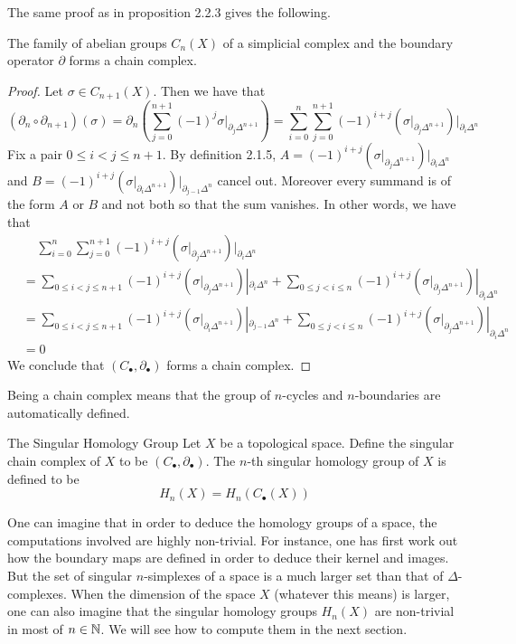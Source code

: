\documentclass[a4paper]{article}
\begin{document}
The same proof as in proposition 2.2.3 gives the following. 

\begin{prp}{}{} The family of abelian groups $C_n(X)$ of a simplicial complex and the boundary operator $\partial$ forms a chain complex. \tcbline
\begin{proof}
Let $\sigma\in C_{n+1}(X)$. Then we have that $$(\partial_n\circ\partial_{n+1})(\sigma)=\partial_n\left(\sum_{j=0}^{n+1}(-1)^j\sigma|_{\partial_j\Delta^{n+1}}\right)=\sum_{i=0}^n\sum_{j=0}^{n+1}(-1)^{i+j}\left(\sigma|_{\partial_j\Delta^{n+1}}\right)|_{\partial_i\Delta^n}$$ Fix a pair $0\leq i<j\leq n+1$. By definition 2.1.5, $A=(-1)^{i+j}\left(\sigma|_{\partial_j\Delta^{n+1}}\right)|_{\partial_i\Delta^n}$ and $B=(-1)^{i+j}\left(\sigma|_{\partial_i\Delta^{n+1}}\right)|_{\partial_{j-1}\Delta^n}$ cancel out. Moreover every summand is of the form $A$ or $B$ and not both so that the sum vanishes. In other words, we have that 
\begin{align*}
&\;\;\;\;\sum_{i=0}^n\sum_{j=0}^{n+1}(-1)^{i+j}\left(\sigma|_{\partial_j\Delta^{n+1}}\right)|_{\partial_i\Delta^n}\\
&=\sum_{0\leq i<j\leq n+1}(-1)^{i+j}\left(\sigma|_{\partial_j\Delta^{n+1}}\right)|_{\partial_i\Delta^n}+\sum_{0\leq j<i\leq n}(-1)^{i+j}\left(\sigma|_{\partial_j\Delta^{n+1}}\right)|_{\partial_i\Delta^n}\\
&=\sum_{0\leq i<j\leq n+1}(-1)^{i+j}\left(\sigma|_{\partial_i\Delta^{n+1}}\right)|_{\partial_{j-1}\Delta^n}+\sum_{0\leq j<i\leq n}(-1)^{i+j}\left(\sigma|_{\partial_j\Delta^{n+1}}\right)|_{\partial_i\Delta^n}\\
&=0
\end{align*}
We conclude that $(C_\bullet,\partial_\bullet)$ forms a chain complex. 
\end{proof}
\end{prp}

Being a chain complex means that the group of $n$-cycles and $n$-boundaries are automatically defined. 

\begin{defn}{The Singular Homology Group}{} Let $X$ be a topological space. Define the singular chain complex of $X$ to be $(C_\bullet,\partial_\bullet)$. The $n$-th singular homology group of $X$ is defined to be $$H_n(X)=H_n(C_\bullet(X))$$
\end{defn}

One can imagine that in order to deduce the homology groups of a space, the computations involved are highly non-trivial. For instance, one has first work out how the boundary maps are defined in order to deduce their kernel and images. But the set of singular $n$-simplexes of a space is a much larger set than that of $\Delta$-complexes. When the dimension of the space $X$ (whatever this means) is larger, one can also imagine that the singular homology groups $H_n(X)$ are non-trivial in most of $n\in\mathbb{N}$. We will see how to compute them in the next section. 
\end{document}
